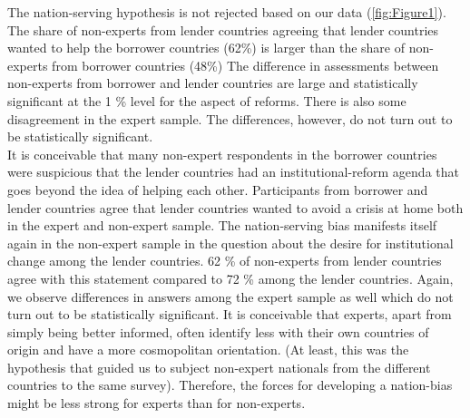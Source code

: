 The nation-serving hypothesis is not rejected based on our data (\autoref{fig:Figure1}). The share of non-experts from lender countries agreeing that lender countries wanted to help the borrower countries (62\%) is larger than the share of non-experts from borrower countries (48\%)
The difference in assessments between
non-experts from borrower and lender countries are large and statistically
significant at the 1 \% level for the aspect of reforms. There is also some disagreement in the expert sample. The differences, however, do not turn out to be statistically significant. \\
It is conceivable that
many non-expert respondents in the borrower countries were suspicious that
the lender countries had an institutional-reform agenda that goes beyond the
idea of helping each other. Participants from borrower and lender countries agree that lender countries wanted to avoid a crisis at home both in the expert and non-expert sample. The nation-serving bias manifests itself again in the non-expert sample in the question about the desire for institutional change among the lender countries. 62 \% of non-experts from lender countries agree with this statement compared to 72 \% among the lender countries. Again, we observe differences in answers among the expert sample as well which do not turn out to be statistically significant. 
It is conceivable that experts, apart from simply being
better informed, often identify less with their own countries of origin and have 
a more cosmopolitan orientation. (At
least, this was the hypothesis that guided us to subject non-expert
nationals from the different countries to the same survey). Therefore, the
forces for developing a nation-bias might be less strong for experts than for non-experts. 

